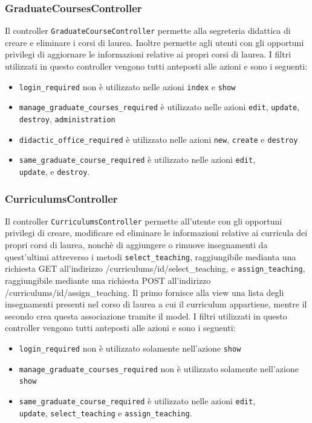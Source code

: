 \documentclass[11pt,a4paper]{article}
\begin{document}
\subsubsection{GraduateCoursesController}
Il controller \verb|GraduateCourseController| permette alla segreteria didattica di creare e eliminare i corsi di laurea. Inoltre permette agli utenti con gli opportuni privilegi di aggiornare le informazioni relative ai propri corsi di laurea.
I filtri utilizzati in questo controller vengono tutti anteposti alle azioni e sono i seguenti:
\begin{itemize}
 \item \verb|login_required| non è utilizzato nelle azioni \verb|index| e \verb|show|
 \item \verb|manage_graduate_courses_required| è utilizzato nelle azioni \verb|edit|, \verb|update|, \verb|destroy|, \verb|administration|
 \item \verb|didactic_office_required| è utilizzato nelle azioni \verb|new|, \verb|create| e \verb|destroy|
 \item \verb|same_graduate_course_required| è utilizzato nelle azioni \verb|edit|,\\ \verb|update|, e \verb|destroy|.
\end{itemize}
\subsubsection{CurriculumsController}
Il controller \verb|CurriculumsController| permette all'utente con gli opportuni privilegi di creare, modificare ed eliminare le informazioni relative ai curricula dei propri corsi di laurea, nonchè di aggiungere o rimuove insegnamenti da quest'ultimi attreverso i metodi \verb|select_teaching|, raggiungibile medianta una richiesta GET all'indirizzo /curriculums/id/select\_teaching, e \verb|assign_teaching|, raggiungibile mediante una richiesta POST all'indirizzo /curriculums/id/assign\_teaching. Il primo fornisce alla view una lista degli insegnamenti presenti nel corso di laurea a cui il curriculum appartiene, mentre il secondo crea questa associazione tramite il model.
I filtri utilizzati in questo controller vengono tutti anteposti alle azioni e sono i seguenti:
\begin{itemize}
 \item \verb|login_required| non è utilizzato solamente nell'azione \verb|show|
 \item \verb|manage_graduate_courses_required| non è utilizzato solamente nell'azione \verb|show|
 \item \verb|same_graduate_course_required| è utilizzato nelle azioni \verb|edit|,\\ \verb|update|, \verb|select_teaching| e \verb|assign_teaching|.
\end{itemize}
\end{document}
